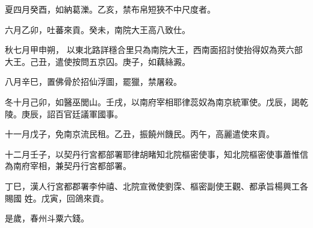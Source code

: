 \begin{pinyinscope}
 夏四月癸酉，如納葛濼。乙亥，禁布帛短狹不中尺度者。



 六月乙卯，吐蕃來貢。癸未，南院大王高八致仕。



 秋七月甲申朔，
 以東北路詳穩合里只為南院大王，西南面招討使抬得奴為莢六部大王。己丑，遣使按問五京囚。庚子，如藕絲澱。



 八月辛巳，置佛骨於招仙浮圖，罷獵，禁屠殺。



 冬十月己卯，如醫巫閭山。壬戌，以南府宰相耶律蕊奴為南京統軍使。戊辰，謁乾陵。庚辰，詔百官廷議軍國事。



 十一月戊子，免南京流民租。乙丑，振饒州饑民。丙午，高麗遣使來貢。



 十二月壬子，以契丹行宮都部署耶律胡睹知北院樞密使事，知北院樞密使事蕭惟信為南府宰相，兼契丹行宮都部署。



 丁巳，漢人行宮都郡署李仲禧、北院宣微使劉霂、樞密副使王觀、都承旨楊興工各賜國
 姓。戊寅，回鴿來貢。



 是歲，春州斗粟六錢。



\end{pinyinscope}